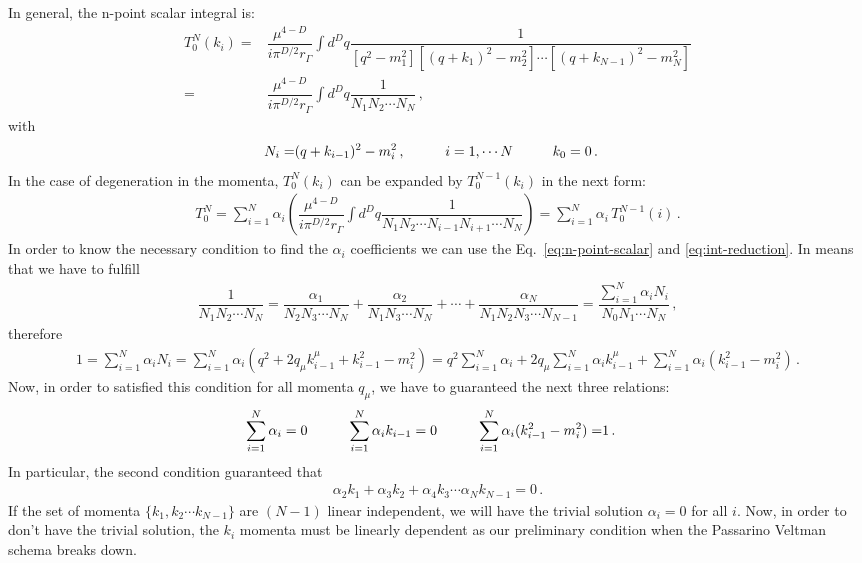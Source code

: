 In general, the n-point scalar integral is:
\begin{align}
\label{eq:n-point-scalar}
T^N_0(k_i)=&\dfrac{\mu^{4-D}}{i\pi^{D/2}r_{\Gamma}}\int d^Dq \dfrac{1}{[q^2-m_1^2][(q+k_1)^2-m_2^2]\cdots[(q+k_{N-1})^2-m_{N}^2]}\nonumber\\
=&\dfrac{\mu^{4-D}}{i\pi^{D/2}r_{\Gamma}}\int d^Dq \dfrac{1}{N_1N_2\cdots N_N}\,,
\end{align} 
with
\begin{align}
N_i=& (q+k_{i-1})^2-m_i^2 \,, \hspace{1 cm} i=1,\cdots N \hspace{1 cm} k_0=0\,.
\end{align}
In the case of degeneration in the momenta, $T^N_0(k_i)$ can be expanded by $T^{N-1}_0(k_i)$ in the next form:
%
\begin{align}
\label{eq:int-reduction}
T_0^N=\sum_{i=1}^{N}\alpha_i\left(\dfrac{\mu^{4-D}}{i\pi^{D/2}r_{\Gamma}}\int d^Dq \dfrac{1}{N_1N_2\cdots N_{i-1}N_{i+1}\cdots N_N}\right)
=\sum_{i=1}^{N}\alpha_i\,T_0^{N-1}(i)\,.
\end{align}
In order to know the necessary condition to find the $\alpha_i$ coefficients we can use the Eq.~\eqref{eq:n-point-scalar} and \eqref{eq:int-reduction}. In means that we  have to fulfill
\begin{align}
\dfrac{1}{N_1N_2\cdots N_N}= \dfrac{\alpha_1}{N_2N_3\cdots N_N}+\dfrac{\alpha_2}{N_1N_3\cdots N_N}+\cdots +\dfrac{\alpha_N}{N_1N_2N_3\cdots N_{N-1}}
=\dfrac{\sum_{i=1}^N\alpha_iN_i}{N_0N_1\cdots N_N}\,,
\end{align}
%
therefore
%
\begin{align}
1=\sum_{i=1}^N\alpha_iN_i=\sum_{i=1}^N\alpha_i(q^2+2q_{\mu}k_{i-1}^{\mu}+k_{i-1}^2-m_{i}^2)
=q^2\sum_{i=1}^N\alpha_i + 2q_{\mu}\sum_{i=1}^N\alpha_ik_{i-1}^{\mu} + \sum_{i=1}^N\alpha_i (k_{i-1}^2-m_i^2)\,.
\end{align}
%
Now, in order to satisfied this condition for all momenta $q_{\mu}$, we have to guaranteed the next three relations:
\begin{align}
\sum_{i=1}^N\alpha_i = 0 \hspace{1 cm}
\sum_{i=1}^N\alpha_ik_{i-1} = 0  \hspace{1 cm}
\sum_{i=1}^N\alpha_i (k_{i-1}^2-m_i^2) =& 1\,.
\end{align}
In particular, the second condition guaranteed that
\begin{align}
\alpha_2k_1+\alpha_3k_2+\alpha_4k_3\cdots \alpha_{N}k_{N-1}=0\,.
\end{align}
%
If the set of momenta $\{k_1, k_2 \cdots k_{N-1}\}$ are $(N-1)$ linear independent, we will have the  trivial solution $\alpha_i=0$ for all $i$. Now, in order to don't have the trivial solution, the $k_i$ momenta must be linearly dependent as our preliminary condition when the Passarino Veltman schema breaks down.

